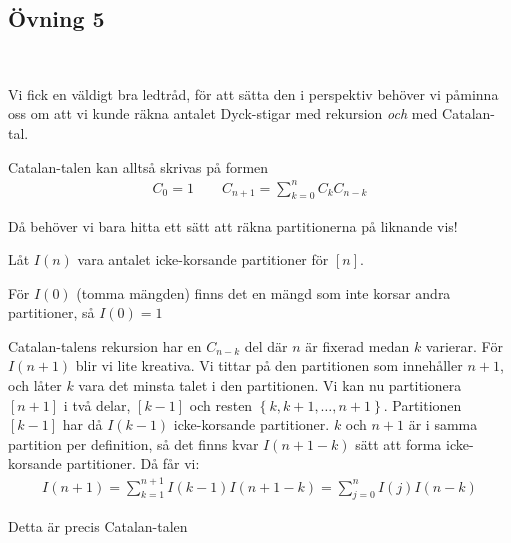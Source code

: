\documentclass{tufte-handout}
\begin{document}
\subsection{Övning 5}\hfill\\\par
\noindent Vi fick en väldigt bra ledtråd, för att sätta den i perspektiv behöver vi påminna oss om att vi kunde räkna antalet Dyck-stigar med rekursion \textit{och} med Catalan-tal.
\par\bigskip
\noindent Catalan-talen kan alltså skrivas på formen
\begin{equation*}
  \begin{gathered}
    C_0 = 1\qquad C_{n+1} = \sum_{k=0}^{n}C_{k}C_{n-k}
  \end{gathered}
\end{equation*}\par
\noindent Då behöver vi bara hitta ett sätt att räkna partitionerna på liknande vis!
\par\bigskip
\noindent Låt $I(n)$ vara antalet icke-korsande partitioner för $[n]$.\par
\noindent För $I(0)$ (tomma mängden) finns det en mängd som inte korsar andra partitioner, så $I(0) = 1$\par
\noindent Catalan-talens rekursion har en $C_{n-k}$ del där $n$ är fixerad medan $k$ varierar. För $I(n+1)$ blir vi lite kreativa. Vi tittar på den partitionen som innehåller $n+1$, och låter $k$ vara det minsta talet i den partitionen. Vi kan nu partitionera $[n+1]$ i två delar, $[k-1]$ och resten $\left\{k,k+1,\hdots,n+1\right\}$. Partitionen $[k-1]$ har då $I(k-1)$ icke-korsande partitioner. $k$ och $n+1$ är i samma partition per definition, så det finns kvar $I(n+1-k)$ sätt att forma icke-korsande partitioner. Då får vi:
\begin{equation*}
  \begin{gathered}
    I(n+1) = \sum_{k=1}^{n+1}I(k-1)I(n+1-k) = \sum_{j=0}^{n}I(j)I(n-k)
  \end{gathered}
\end{equation*}\par
\noindent Detta är precis Catalan-talen



\end{document}
